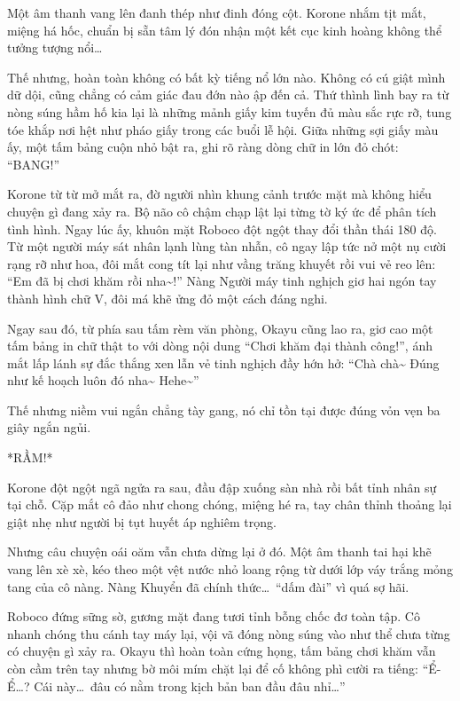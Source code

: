 \documentclass[../main.tex]{subfiles}
\begin{document}
Một âm thanh vang lên đanh thép như đinh đóng cột. Korone nhắm tịt mắt, miệng há hốc, chuẩn bị sẵn tâm lý đón nhận một kết cục kinh hoàng không thể tưởng tượng nổi\dots

Thế nhưng, hoàn toàn không có bất kỳ tiếng nổ lớn nào. Không có cú giật mình dữ dội, cũng chẳng có cảm giác đau đớn nào ập đến cả. Thứ thình lình bay ra từ nòng súng hầm hố kia lại là những mảnh giấy kim tuyến đủ màu sắc rực rỡ, tung tóe khắp nơi hệt như pháo giấy trong các buổi lễ hội. Giữa những sợi giấy màu ấy, một tấm bảng cuộn nhỏ bật ra, ghi rõ ràng dòng chữ in lớn đỏ chót: ``BANG!''

Korone từ từ mở mắt ra, đờ người nhìn khung cảnh trước mặt mà không hiểu chuyện gì đang xảy ra. Bộ não cô chậm chạp lật lại từng tờ ký ức để phân tích tình hình. Ngay lúc ấy, khuôn mặt Roboco đột ngột thay đổi thần thái 180 độ. Từ một người máy sát nhân lạnh lùng tàn nhẫn, cô ngay lập tức nở một nụ cười rạng rỡ như hoa, đôi mắt cong tít lại như vầng trăng khuyết rồi vui vẻ reo lên: ``Em đã bị chơi khăm rồi nha\~{}!'' Nàng Người máy tinh nghịch giơ hai ngón tay thành hình chữ V, đôi má khẽ ửng đỏ một cách đáng nghi.

Ngay sau đó, từ phía sau tấm rèm văn phòng, Okayu cũng lao ra, giơ cao một tấm bảng in chữ thật to với dòng nội dung ``Chơi khăm đại thành công!'', ánh mắt lấp lánh sự đắc thắng xen lẫn vẻ tinh nghịch đầy hớn hở: ``Chà chà\~{} Đúng như kế hoạch luôn đó nha\~{} Hehe\~{}''


Thế nhưng niềm vui ngắn chẳng tày gang, nó chỉ tồn tại được đúng vỏn vẹn ba giây ngắn ngủi.

*RẦM!*

Korone đột ngột ngã ngửa ra sau, đầu đập xuống sàn nhà rồi bất tỉnh nhân sự tại chỗ. Cặp mắt cô đảo như chong chóng, miệng hé ra, tay chân thỉnh thoảng lại giật nhẹ như người bị tụt huyết áp nghiêm trọng.


Nhưng câu chuyện oái oăm vẫn chưa dừng lại ở đó. Một âm thanh tai hại khẽ vang lên xè xè, kéo theo một vệt nước nhỏ loang rộng từ dưới lớp váy trắng mỏng tang của cô nàng. Nàng Khuyển đã chính thức\dots\ ``dấm đài'' vì quá sợ hãi.

Roboco đứng sững sờ, gương mặt đang tươi tỉnh bỗng chốc đơ toàn tập. Cô nhanh chóng thu cánh tay máy lại, vội vã đóng nòng súng vào như thể chưa từng có chuyện gì xảy ra. Okayu thì hoàn toàn cứng họng, tấm bảng chơi khăm vẫn còn cầm trên tay nhưng bờ môi mím chặt lại để cố không phì cười ra tiếng: ``Ể-Ể\dots? Cái này\dots\ đâu có nằm trong kịch bản ban đầu đâu nhỉ\dots''
\end{document}
